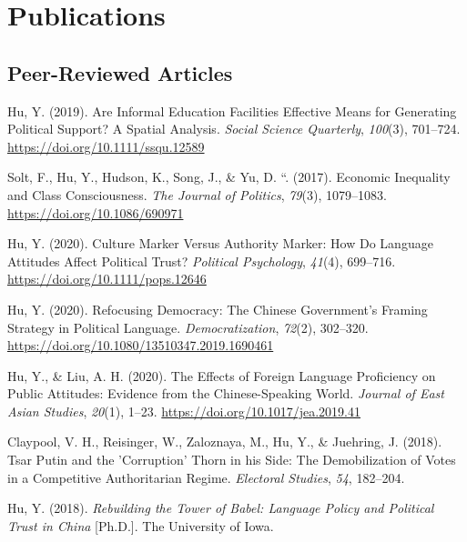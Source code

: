 \documentclass[11pt, a4paper]{awesome-cv}
\begin{document}
\hypertarget{publications}{%
\section{Publications}\label{publications}}

\hypertarget{peer-reviewed-articles}{%
\subsection{Peer-Reviewed Articles}\label{peer-reviewed-articles}}

\begingroup
\setlength{\parindent}{-0.5in}
\setlength{\leftskip}{0.5in}

\hypertarget{refs_published}{}
\leavevmode\hypertarget{ref-Hu2019}{}%
Hu, Y. (2019). Are Informal Education Facilities Effective Means for
Generating Political Support? A Spatial Analysis. \emph{Social Science
Quarterly}, \emph{100}(3), 701--724.
\url{https://doi.org/10.1111/ssqu.12589}

\leavevmode\hypertarget{ref-SoltEtAl2017}{}%
Solt, F., Hu, Y., Hudson, K., Song, J., \& Yu, D. ``. (2017). Economic
Inequality and Class Consciousness. \emph{The Journal of Politics},
\emph{79}(3), 1079--1083. \url{https://doi.org/10.1086/690971}

\leavevmode\hypertarget{ref-Hu2020}{}%
Hu, Y. (2020). Culture Marker Versus Authority Marker: How Do Language
Attitudes Affect Political Trust? \emph{Political Psychology},
\emph{41}(4), 699--716. \url{https://doi.org/10.1111/pops.12646}

\leavevmode\hypertarget{ref-Hu2020a}{}%
Hu, Y. (2020). Refocusing Democracy: The Chinese Government's Framing
Strategy in Political Language. \emph{Democratization}, \emph{72}(2),
302--320. \url{https://doi.org/10.1080/13510347.2019.1690461}

\leavevmode\hypertarget{ref-HuLiu2020}{}%
Hu, Y., \& Liu, A. H. (2020). The Effects of Foreign Language
Proficiency on Public Attitudes: Evidence from the Chinese-Speaking
World. \emph{Journal of East Asian Studies}, \emph{20}(1), 1--23.
\url{https://doi.org/10.1017/jea.2019.41}

\leavevmode\hypertarget{ref-ClaypoolEtAl2018}{}%
Claypool, V. H., Reisinger, W., Zaloznaya, M., Hu, Y., \& Juehring, J.
(2018). Tsar Putin and the 'Corruption' Thorn in his Side: The
Demobilization of Votes in a Competitive Authoritarian Regime.
\emph{Electoral Studies}, \emph{54}, 182--204.

\leavevmode\hypertarget{ref-Hu2018c}{}%
Hu, Y. (2018). \emph{Rebuilding the Tower of Babel: Language Policy and
Political Trust in China} {[}Ph.D.{]}. The University of Iowa.
\end{document}
